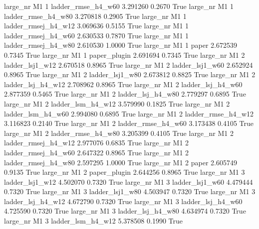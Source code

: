   large_nr       M1                 1  ladder_rmse_h4_w60   3.291260      0.2670    True
  large_nr       M1                 1  ladder_rmse_h4_w80   3.270818      0.2905    True
  large_nr       M1                 1 ladder_rmsej_h4_w12   3.069636      0.5155    True
  large_nr       M1                 1 ladder_rmsej_h4_w60   2.630533      0.7870    True
  large_nr       M1                 1 ladder_rmsej_h4_w80   2.610530      1.0000    True
  large_nr       M1                 1               paper   2.672539      0.7345    True
  large_nr       M1                 1        paper_plugin   2.691694      0.7345    True
  large_nr       M1                 2     ladder_lsj1_w12   2.670518      0.8965    True
  large_nr       M1                 2     ladder_lsj1_w60   2.652924      0.8965    True
  large_nr       M1                 2     ladder_lsj1_w80   2.673812      0.8825    True
  large_nr       M1                 2   ladder_lsj_h4_w12   2.708962      0.8965    True
  large_nr       M1                 2   ladder_lsj_h4_w60   2.877359      0.5465    True
  large_nr       M1                 2   ladder_lsj_h4_w80   2.779297      0.6895    True
  large_nr       M1                 2   ladder_lsm_h4_w12   3.579990      0.1825    True
  large_nr       M1                 2   ladder_lsm_h4_w60   2.994080      0.6895    True
  large_nr       M1                 2  ladder_rmse_h4_w12   3.116823      0.2140    True
  large_nr       M1                 2  ladder_rmse_h4_w60   3.173438      0.4105    True
  large_nr       M1                 2  ladder_rmse_h4_w80   3.205399      0.4105    True
  large_nr       M1                 2 ladder_rmsej_h4_w12   2.977076      0.6835    True
  large_nr       M1                 2 ladder_rmsej_h4_w60   2.647322      0.8965    True
  large_nr       M1                 2 ladder_rmsej_h4_w80   2.597295      1.0000    True
  large_nr       M1                 2               paper   2.605749      0.9135    True
  large_nr       M1                 2        paper_plugin   2.644256      0.8965    True
  large_nr       M1                 3     ladder_lsj1_w12   4.502070      0.7320    True
  large_nr       M1                 3     ladder_lsj1_w60   4.479444      0.7320    True
  large_nr       M1                 3     ladder_lsj1_w80   4.503947      0.7320    True
  large_nr       M1                 3   ladder_lsj_h4_w12   4.672790      0.7320    True
  large_nr       M1                 3   ladder_lsj_h4_w60   4.725590      0.7320    True
  large_nr       M1                 3   ladder_lsj_h4_w80   4.634974      0.7320    True
  large_nr       M1                 3   ladder_lsm_h4_w12   5.378508      0.1990    True
